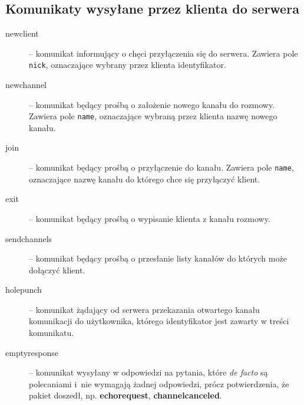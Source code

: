 \documentclass[a4paper, 10pt]{article}
\begin{document}
\subsection{Komunikaty wysyłane przez klienta do serwera}
\begin{description}
 \item[newclient] -- komunikat informujący o chęci przyłączenia się do serwera. Zawiera pole \texttt{nick}, oznaczające wybrany przez klienta identyfikator.
 \item[newchannel] -- komunikat będący prośbą o założenie nowego kanału do rozmowy. Zawiera pole \texttt{name}, oznaczające wybraną przez klienta nazwę nowego kanału.
 \item[join] -- komunikat będący prośbą o przyłączenie do kanału. Zawiera pole \texttt{name}, oznaczające nazwę kanału do którego chce się przyłączyć klient.
 \item[exit] -- komunikat będący prośbą o wypisanie klienta z kanału rozmowy.
 \item[sendchannels] -- komunikat będący prośbą o przesłanie listy kanałów do których może dołączyć klient.
 \item[holepunch] -- komunikat żądający od serwera przekazania otwartego kanału komunikacji do użytkownika, którego identyfikator jest zawarty w treści komunikatu.
 \item[emptyresponse] -- komunikat wysyłany w odpowiedzi na pytania, które \textit{de facto} są polecaniami i~nie wymagają żadnej odpowiedzi, prócz potwierdzenia, że pakiet doszedł, np. \textbf{echorequest}, \textbf{channelcanceled}.
\end{description}
\end{document}
